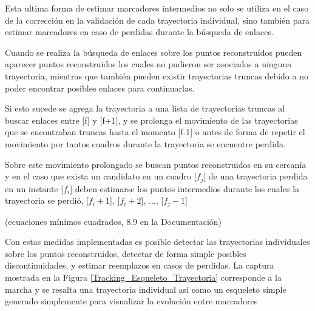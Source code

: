 Esta ultima forma de estimar marcadores intermedios no solo se utiliza en el caso de la corrección en la validación de cada trayectoria individual, sino también para estimar marcadores en caso de perdidas durante la búsqueda de enlaces. 

Cuando se realiza la búsqueda de enlaces sobre los puntos reconstruidos pueden aparecer puntos reconstruidos los cuales no pudieron ser asociados a ninguna trayectoria, mientras que también pueden existir trayectorias truncas debido a no poder encontrar posibles enlaces para continuarlas.

Si esto sucede se agrega la trayectoria a una lista de trayectorias truncas al buscar enlaces entre [f] y [f+1], y se prolonga el movimiento de las trayectorias que se encontraban truncas hasta el momento [f-1] o antes de forma de repetir el movimiento por tantos cuadros durante la trayectoria se encuentre perdida. 

Sobre este movimiento prolongado se buscan puntos reconstruidos en su cercanía y en el caso que exista un candidato en un cuadro [$f_{j}$] de una trayectoria perdida en un instante [$f_{i}$] deben estimarse los puntos intermedios durante los cuales la trayectoria se perdió, [$f_{i}+1$], [$f_{i}+2$], ..., [$f_{j}-1$]

(ecuaciones mínimos cuadrados, 8.9 en la Documentación)

Con estas medidas implementadas es posible detectar las trayectorias individuales sobre los puntos reconstruidos, detectar de forma simple posibles discontinuidades, y estimar reemplazos en casos de perdidas. La captura mostrada en la Figura \ref{Tracking_Esqueleto_Trayectoria} corresponde a la marcha y se resalta una trayectoria individual así como un esqueleto simple generado simplemente para visualizar la evolución entre marcadores

